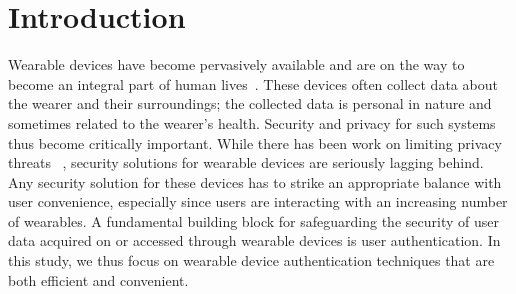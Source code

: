 \section{Introduction}\label{sec:intro}

Wearable devices have become pervasively available and are on the way to become an integral part of human
lives~\cite{googleglass,smartwatch,fitbit}.  %
These devices often collect data about the wearer and their
surroundings; the collected data is personal in nature and
sometimes related to the wearer's health. Security and privacy for such systems thus become critically important. While there has been work on limiting privacy
threats
~\cite{hoyle2015sensitive,hoyle2014privacy,jana2013scanner}, security solutions for wearable devices are seriously lagging behind.
Any security solution for these devices has to strike an
appropriate balance with user convenience, especially since users are interacting
with an increasing number of wearables. A fundamental building
block for safeguarding the security of user data acquired on or accessed
through wearable devices is user authentication. %
In this study, we thus focus on wearable device authentication techniques that are both efficient and convenient.

